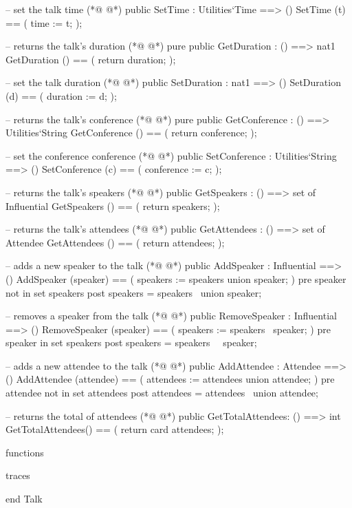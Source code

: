 \begin{vdmpp}[breaklines=true]
  -- set the talk time
(*@
\label{SetTime:77}
@*)
  public SetTime : Utilities`Time ==> ()
    SetTime (t) == (
     time := t;
    );
    
  -- returns the talk's duration
(*@
\label{GetDuration:83}
@*)
  pure public GetDuration : () ==> nat1
    GetDuration () == (
     return duration;
    );
    
  -- set the talk duration
(*@
\label{SetDuration:89}
@*)
  public SetDuration : nat1 ==> ()
    SetDuration (d) == (
     duration := d;
    );
    
   -- returns the talk's conference
(*@
\label{GetConference:95}
@*)
  pure public GetConference : () ==> Utilities`String
    GetConference () == (
     return conference;
    );
    
  -- set the conference conference
(*@
\label{SetConference:101}
@*)
  public SetConference : Utilities`String ==> ()
    SetConference (c) == (
     conference := c;
    );
    
   -- returns the talk's speakers
(*@
\label{GetSpeakers:107}
@*)
  public GetSpeakers : () ==> set of Influential
    GetSpeakers () == (
     return speakers;
    );
    
   -- returns the talk's attendees
(*@
\label{GetAttendees:113}
@*)
  public GetAttendees : () ==> set of Attendee
    GetAttendees () == (
     return attendees;
    );
    
  -- adds a new speaker to the talk
(*@
\label{AddSpeaker:119}
@*)
   public AddSpeaker : Influential ==> ()
    AddSpeaker (speaker) == (
     speakers := speakers union {speaker};
    ) 
    pre speaker not in set speakers
   post speakers = speakers~ union {speaker};
   
  -- removes a speaker from the talk
(*@
\label{RemoveSpeaker:127}
@*)
   public RemoveSpeaker : Influential ==> ()
    RemoveSpeaker (speaker) == (
     speakers := speakers \ {speaker};
    ) 
    pre speaker in set speakers
   post speakers = speakers~ \ {speaker};
    
  -- adds a new attendee to the talk
(*@
\label{AddAttendee:135}
@*)
  public AddAttendee : Attendee ==> ()
    AddAttendee (attendee) == (
     attendees := attendees union {attendee};
    ) 
    pre attendee not in set attendees
   post attendees = attendees~ union {attendee};
   
 -- returns the total of attendees  
(*@
\label{GetTotalAttendees:143}
@*)
 public GetTotalAttendees: () ==> int
  GetTotalAttendees() == (
   return card attendees;
  );
  
functions

traces

end Talk
\end{vdmpp}
